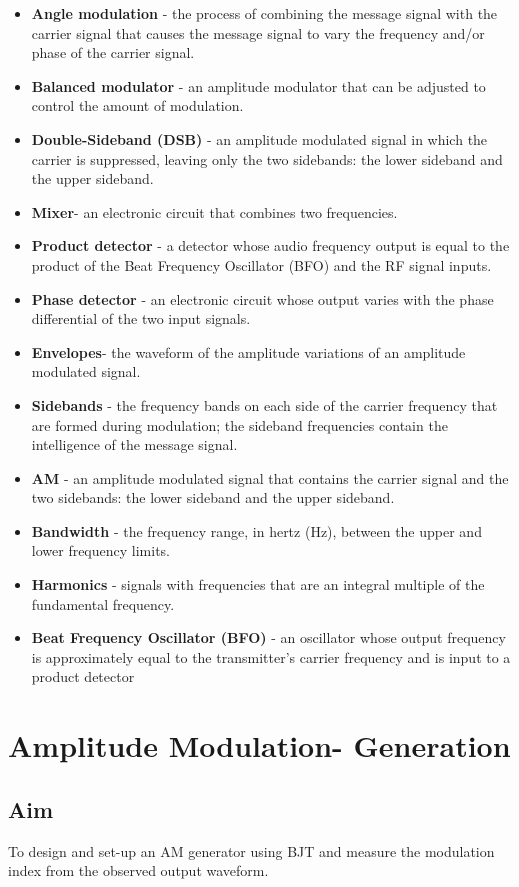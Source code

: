 \documentclass{book}
\begin{document}
\begin{itemize}
\item \textbf{Angle modulation} - the process of combining the message signal with the carrier signal that causes the message signal to vary the frequency and/or phase of the
carrier signal.
\item \textbf{Balanced modulator} - an amplitude modulator that can be adjusted to control the
amount of modulation.
\item \textbf{Double-Sideband (DSB)} - an amplitude modulated signal in which the carrier is
suppressed, leaving only the two sidebands: the lower sideband and the upper
sideband.
\item \textbf{Mixer}- an electronic circuit that combines two frequencies.
\item \textbf{Product detector} - a detector whose audio frequency output is equal to the product of the
Beat
Frequency Oscillator (BFO) and the RF signal inputs.
\item \textbf{Phase detector} - an electronic circuit whose output varies with the phase differential
of the two input signals.
\item \textbf{Envelopes}- the waveform of the amplitude variations of an amplitude modulated
signal. 
\item \textbf{Sidebands} - the frequency bands on each side of the carrier frequency that
are formed during modulation; the sideband frequencies contain the intelligence of
the message signal.
\item \textbf{AM} - an amplitude modulated signal that contains the carrier signal and the two
sidebands: the lower sideband and the upper sideband.
\item \textbf{Bandwidth} - the frequency range, in hertz (Hz), between the upper and lower
frequency limits. 
\item \textbf{Harmonics} - signals with frequencies that are an integral multiple of
the fundamental frequency. 
\item \textbf{Beat Frequency Oscillator (BFO)} - an oscillator whose
output frequency is approximately equal to the transmitter's carrier frequency and is
input to a product detector
\end {itemize}

\chapter[Amplitude Modulation- Generation]{Amplitude Modulation- Generation}

\section*{Aim}
To design and set-up  an AM generator using BJT and measure the modulation index from the observed output waveform.
\end{document}
